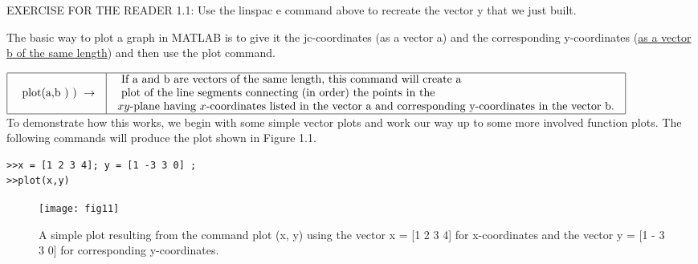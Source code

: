 \documentclass[../main.tex]{subfiles}
\begin{document}
EXERCISE FOR THE READER 1.1: Use the linspac e command above to recreate the vector y that we just built.


The basic way to plot a graph in MATLAB is to give it the jc-coordinates (as a
vector a) and the corresponding y-coordinates (\underline {as a vector b of the same length})
and then use the plot command.

$
\begin{array}{|l|l|}
\hline \begin{array}{l}
\text { plot(a,b ) ) } \rightarrow \\
\end{array} & \begin{array}{l}
\text { If a and b are vectors of the same length, this command will create a } \\
\text { plot of the line segments connecting (in order) the points in the }\\
\text {$xy$-plane having $x$-coordinates listed in the vector a and }
\text{corresponding y-coordinates in the vector b.}
\end{array} \\
\hline
\end{array}
$\\



To demonstrate how this works, we begin with some simple vector plots and work
our way up to some more involved function plots. The following commands will
produce the plot shown in Figure 1.1.\\

\begin{verbatim}
>>x = [1 2 3 4]; y = [1 -3 3 0] ;
>>plot(x,y) 
\end{verbatim}

\begin{figure}[H]
\centering
\texttt{[image: fig11]}
\caption{A simple plot resulting from the command plot (x, y) using the vector
x = [1 2 3 4] for x-coordinates and the vector y = [1 - 3 3 0] for corresponding
y-coordinates. \protect\footnotemark[5] }
\label{fig:fig_1_1}
\end{figure}

\end{document}
